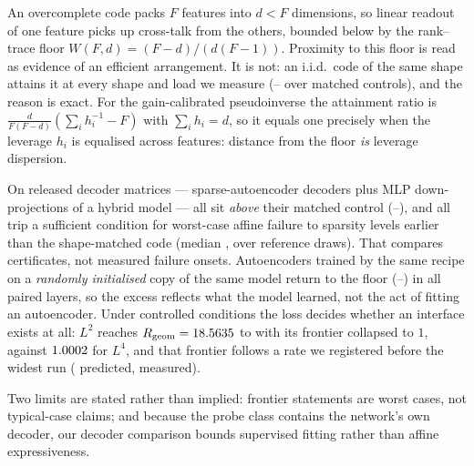 An overcomplete code packs $F$ features into $d<F$ dimensions, so linear readout of one
feature picks up cross-talk from the others, bounded below by the rank--trace floor
$W(F,d)=(F-d)/(d(F-1))$. Proximity to this floor is read as evidence of an efficient arrangement. It
is not: an i.i.d.\ code of the same shape attains it at every shape and load we measure
(\SaeCtlRgeomMin--\SaeCtlRgeomMax{} over \SaeControls{} matched controls), and the reason is exact.
For the gain-calibrated pseudoinverse the attainment ratio is
$\frac{d}{F(F-d)}(\sum_i h_i^{-1}-F)$ with $\sum_i h_i=d$, so it equals one precisely when the
leverage $h_i$ is equalised across features: distance from the floor \emph{is} leverage dispersion.

On \SaeDicts{} released decoder matrices --- \SaeSaeCount{} sparse-autoencoder decoders plus
\SaeMlpCount{} MLP down-projections of a hybrid model --- all sit \emph{above} their matched control
(\SaeDictRgeomMin--\SaeDictRgeomMax), and all trip a sufficient condition for worst-case affine
failure \SaeFailGapMin{} to \SaeFailGapMax{} sparsity levels earlier than the shape-matched code
(median \SaeFailGapMedian{}, over \SaeFailRefs{} reference draws). That compares certificates, not
measured failure onsets. Autoencoders trained by the same
recipe on a \emph{randomly initialised} copy of the same model return to the floor
(\SaeRandInitRgeomMin--\SaeRandInitRgeomMax) in all \SaePairedLayers{} paired layers, so the excess
reflects what the model learned, not the act of fitting an autoencoder. Under controlled conditions
the loss decides whether an interface exists at all: $L^2$ reaches
$R_{\mathrm{geom}}=18.5635$ to \ScLtwoRgeom{} with its frontier collapsed to $1$, against
$1.0002$ for $L^4$, and that frontier follows a rate we registered before the widest
run (\ScRegistered{} predicted, \ScMeasured{} measured).

Two limits are stated rather than implied: frontier statements are worst cases, not typical-case
claims; and because the probe class contains the network's own decoder, our decoder comparison
bounds supervised fitting rather than affine expressiveness.
